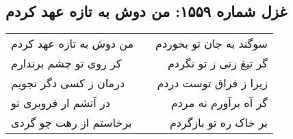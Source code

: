 \begin{center}
\section*{غزل شماره ۱۵۵۹: من دوش به تازه عهد کردم}
\label{sec:1559}
\begin{longtable}{l p{0.5cm} r}
من دوش به تازه عهد کردم
&&
سوگند به جان تو بخوردم
\\
کز روی تو چشم برندارم
&&
گر تیغ زنی ز تو نگردم
\\
درمان ز کسی دگر نجویم
&&
زیرا ز فراق توست دردم
\\
در آتشم ار فروبری تو
&&
گر آه برآورم نه مردم
\\
برخاستم از رهت چو گردی
&&
بر خاک ره تو بازگردم
\\
\end{longtable}
\end{center}
